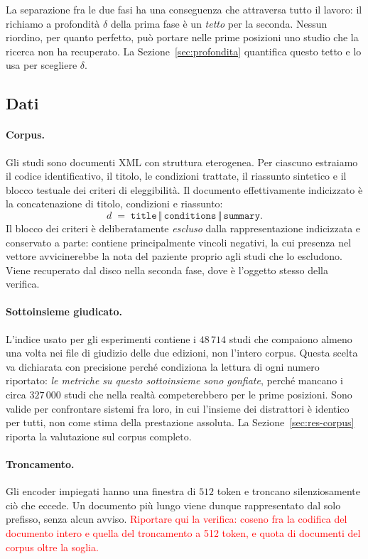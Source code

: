 \documentclass[pdflatex,sn-mathphys-num]{sn-jnl}
\theoremstyle{thmstyleone}
\theoremstyle{thmstyletwo}
\theoremstyle{thmstylethree}
\newcommand{\ev}[1]{\textcolor{red}{#1}}
\begin{document}
La separazione fra le due fasi ha una conseguenza che attraversa tutto il lavoro: il richiamo a profondità $\delta$ della prima fase è un \emph{tetto} per la seconda. Nessun riordino, per quanto perfetto, può portare nelle prime posizioni uno studio che la ricerca non ha recuperato. La Sezione~\ref{sec:profondita} quantifica questo tetto e lo usa per scegliere $\delta$.

\subsection{Dati}\label{sec:dati}

\paragraph{Corpus.} Gli studi sono documenti XML con struttura eterogenea. Per ciascuno estraiamo il codice identificativo, il titolo, le condizioni trattate, il riassunto sintetico e il blocco testuale dei criteri di eleggibilità. Il documento effettivamente indicizzato è la concatenazione di titolo, condizioni e riassunto:
\begin{equation}
  d \;=\; \texttt{title} \,\Vert\, \texttt{conditions} \,\Vert\, \texttt{summary}.
  \label{eq:documento}
\end{equation}
Il blocco dei criteri è deliberatamente \emph{escluso} dalla rappresentazione indicizzata e conservato a parte: contiene principalmente vincoli negativi, la cui presenza nel vettore avvicinerebbe la nota del paziente proprio agli studi che lo escludono. Viene recuperato dal disco nella seconda fase, dove è l'oggetto stesso della verifica.

\paragraph{Sottoinsieme giudicato.} L'indice usato per gli esperimenti contiene i $48\,714$ studi che compaiono almeno una volta nei file di giudizio delle due edizioni, non l'intero corpus. Questa scelta va dichiarata con precisione perché condiziona la lettura di ogni numero riportato: \emph{le metriche su questo sottoinsieme sono gonfiate}, perché mancano i circa $327\,000$ studi che nella realtà competerebbero per le prime posizioni. Sono valide per confrontare sistemi fra loro, in cui l'insieme dei distrattori è identico per tutti, non come stima della prestazione assoluta. La Sezione~\ref{sec:res-corpus} riporta la valutazione sul corpus completo.

\paragraph{Troncamento.} Gli encoder impiegati hanno una finestra di $512$ token e troncano silenziosamente ciò che eccede. Un documento più lungo viene dunque rappresentato dal solo prefisso, senza alcun avviso. \ev{Riportare qui la verifica: coseno fra la codifica del documento intero e quella del troncamento a 512 token, e quota di documenti del corpus oltre la soglia.}
\end{document}
